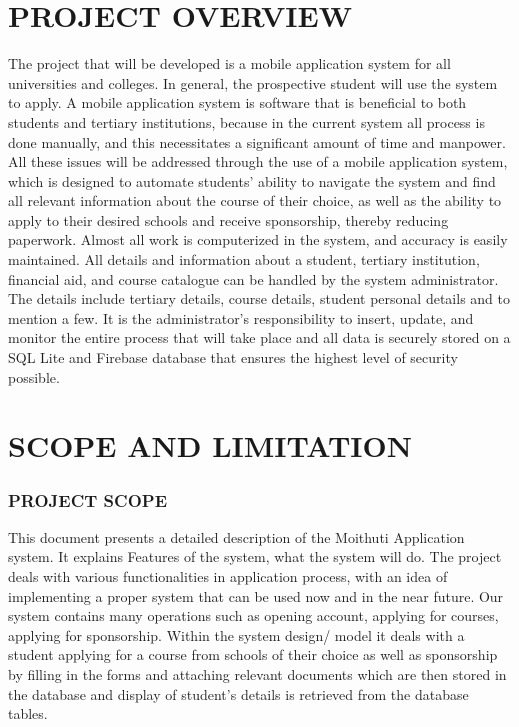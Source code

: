 \section{PROJECT OVERVIEW}
The project that will be developed is a mobile application system for all universities and colleges. In general, the prospective student will use the system to apply. A mobile application system is software that is beneficial to both students and tertiary institutions, because in the current system all process is done manually, and this necessitates a significant amount of time and manpower. All these issues will be addressed through the use of a mobile application system, which is designed to automate students' ability to navigate the system and find all relevant information about the course of their choice, as well as the ability to apply to their desired schools and receive sponsorship, thereby reducing paperwork. Almost all work is computerized in the system, and accuracy is easily maintained. All details and information about a student, tertiary institution, financial aid, and course catalogue can be handled by the system administrator. The details include tertiary details, course details, student personal details and to mention a few. It is the administrator's responsibility to insert, update, and monitor the entire process that will take place and all data is securely stored on a SQL Lite and Firebase database that ensures the highest level of security possible. 

\section{SCOPE AND LIMITATION}
\subsubsection{PROJECT SCOPE}
This document presents a detailed description of the Moithuti Application system. It explains Features of the system, what the system will do. The project deals with various functionalities in application process, with an idea of implementing a proper system that can be used now and in the near future. Our system contains many operations such as opening account, applying for courses, applying for sponsorship. Within the system design/ model it deals with a student applying for a course from schools of their choice as well as sponsorship by filling in the forms and attaching relevant documents which are then stored in the database and display of student’s details is retrieved from the database tables.

